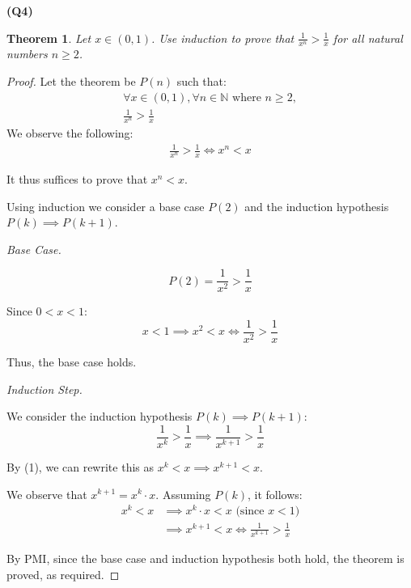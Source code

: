 \documentclass[12pt, a4paper]{article}
\newcommand{\N}{\mathbb{N}}
\newtheorem{theorem}{Theorem}
\begin{document}
\noindent\textbf{(Q4)}

\begin{theorem}
    Let $x \in (0, 1)$. Use induction to prove that $\frac{1}{x^n} > \frac{1}{x}$ for all
    natural numbers $n \geq 2$.
\end{theorem}

\begin{proof}
    Let the theorem be $P(n)$ such that:
    \begin{gather*}
        \forall x \in (0,1), \forall n \in \N \text{ where $n \geq 2$},\\
        \frac{1}{x^n} > \frac{1}{x}
    \end{gather*}
    We observe the following:
    \begin{gather}
        \frac{1}{x^n} > \frac{1}{x} \iff x^n < x
    \end{gather}

    It thus suffices to prove that $x^n < x$.

    Using induction we consider a base case $P(2)$ and the induction hypothesis
    $P(k) \implies P(k + 1)$.

    \noindent\textit{Base Case.}
    
    \[
        P(2) = \frac{1}{x^2} > \frac{1}{x}
    \]

    Since $0 < x < 1$:
    \[
        x < 1 \implies x^2 < x \iff \frac{1}{x^2} > \frac{1}{x}
    \]

    Thus, the base case holds.

    \noindent\textit{Induction Step.}

    We consider the induction hypothesis $P(k) \implies P(k + 1)$:
    \[
        \frac{1}{x^k} > \frac{1}{x} \implies \frac{1}{x^{k + 1}} > \frac{1}{x}
    \]

    By (1), we can rewrite this as $x^k < x \implies x^{k + 1} < x$.

    We observe that $x^{k + 1} = x^k \cdot x$. Assuming $P(k)$, it follows:
    \begin{align*}
        x^k < x & \implies x^k \cdot x < x \text{ (since $x < 1$)}\\
        & \implies x^{k + 1} < x \iff \frac{1}{x^{k + 1}} > \frac{1}{x}
    \end{align*}

    By PMI, since the base case and induction hypothesis both hold, the theorem is proved,
    as required.

\end{proof}
\end{document}
